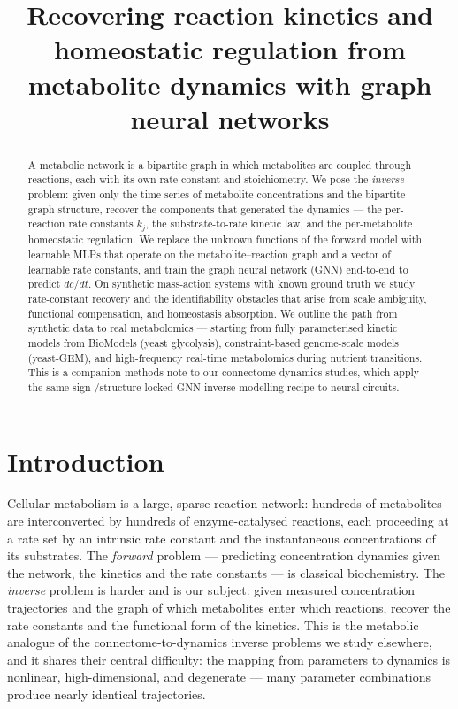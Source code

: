 \documentclass[11pt]{article}
\title{\textbf{Recovering reaction kinetics and homeostatic regulation from
metabolite dynamics with graph neural networks}}
\author{}
\date{}
\begin{document}
\maketitle
\begin{abstract}
A metabolic network is a bipartite graph in which metabolites are coupled
through reactions, each with its own rate constant and stoichiometry. We
pose the \emph{inverse} problem: given only the time series of metabolite
concentrations and the bipartite graph structure, recover the components
that generated the dynamics --- the per-reaction rate constants $k_j$, the
substrate-to-rate kinetic law, and the per-metabolite homeostatic
regulation. We replace the unknown functions of the forward model with
learnable MLPs that operate on the metabolite--reaction graph and a vector
of learnable rate constants, and train the graph neural network (GNN)
end-to-end to predict $dc/dt$. On synthetic mass-action systems with known
ground truth we study rate-constant recovery and the identifiability
obstacles that arise from scale ambiguity, functional compensation, and
homeostasis absorption. We outline the path from synthetic data to real
metabolomics --- starting from fully parameterised kinetic models from
BioModels (yeast glycolysis), constraint-based genome-scale models
(yeast-GEM), and high-frequency real-time metabolomics during nutrient
transitions. This is a companion methods note to our connectome-dynamics
studies, which apply the same sign-/structure-locked GNN inverse-modelling
recipe to neural circuits.
\end{abstract}

\section{Introduction}
\label{sec:intro}

Cellular metabolism is a large, sparse reaction network: hundreds of
metabolites are interconverted by hundreds of enzyme-catalysed reactions,
each proceeding at a rate set by an intrinsic rate constant and the
instantaneous concentrations of its substrates. The \emph{forward} problem
--- predicting concentration dynamics given the network, the kinetics and
the rate constants --- is classical biochemistry. The \emph{inverse}
problem is harder and is our subject: given measured concentration
trajectories and the graph of which metabolites enter which reactions,
recover the rate constants and the functional form of the kinetics. This
is the metabolic analogue of the connectome-to-dynamics inverse problems
we study elsewhere, and it shares their central difficulty: the mapping
from parameters to dynamics is nonlinear, high-dimensional, and degenerate
--- many parameter combinations produce nearly identical trajectories.
\end{document}

